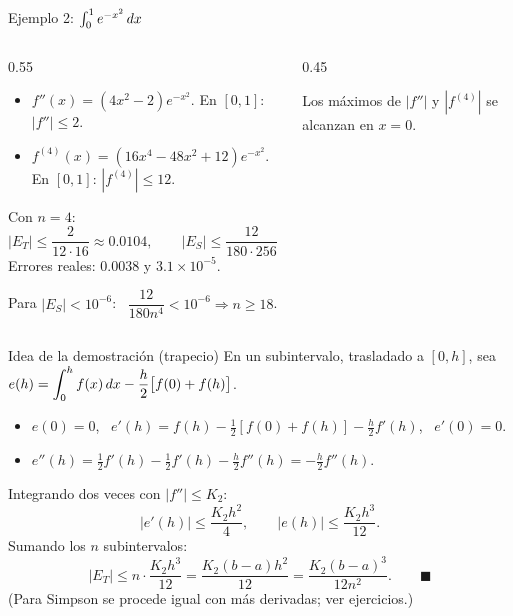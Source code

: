 \documentclass[10pt,aspectratio=169]{beamer}
\begin{document}
\begin{frame}{Ejemplo 2: $\int_0^1e^{-x^2}\,dx$}
  \begin{columns}
    \begin{column}{0.55\textwidth}
      \begin{itemize}
        \item $f''(x)=(4x^2-2)e^{-x^2}$. En $[0,1]$: $|f''|\le2$.
        \item $f^{(4)}(x)=(16x^4-48x^2+12)e^{-x^2}$. En $[0,1]$: $|f^{(4)}|\le12$.
      \end{itemize}
      Con $n=4$:
      \[ |E_T|\le\frac{2}{12\cdot16}\approx0.0104,\qquad |E_S|\le\frac{12}{180\cdot256}\approx2.6\times10^{-4}. \]
      Errores reales: $0.0038$ y $3.1\times10^{-5}$.
      \medskip

      Para $|E_S|<10^{-6}$: \ $\dfrac{12}{180n^4}<10^{-6}\Rightarrow n\ge 18$.
    \end{column}
    \begin{column}{0.45\textwidth}
      \centering

      \small Los máximos de $|f''|$ y $|f^{(4)}|$ se alcanzan en $x=0$.
    \end{column}
  \end{columns}
\end{frame}

\begin{frame}{Idea de la demostración (trapecio)}
  En un subintervalo, trasladado a $[0,h]$, sea $e(h)=\displaystyle\int_0^hf(x)\,dx-\frac h2\big[f(0)+f(h)\big]$.
  \begin{itemize}
    \item $e(0)=0$, \ $e'(h)=f(h)-\tfrac12[f(0)+f(h)]-\tfrac h2f'(h)$, \ $e'(0)=0$.
    \item $e''(h)=\tfrac12f'(h)-\tfrac12f'(h)-\tfrac h2f''(h)=-\tfrac h2f''(h)$.
  \end{itemize}
  Integrando dos veces con $|f''|\le K_2$:
  \[ |e'(h)|\le\frac{K_2h^2}{4},\qquad |e(h)|\le\frac{K_2h^3}{12}. \]
  Sumando los $n$ subintervalos:
  \[ |E_T|\le n\cdot\frac{K_2h^3}{12}=\frac{K_2(b-a)h^2}{12}=\frac{K_2(b-a)^3}{12n^2}.\qquad\blacksquare \]
  \small (Para Simpson se procede igual con más derivadas; ver ejercicios.)
\end{frame}
\end{document}
